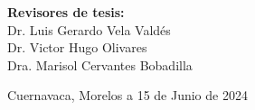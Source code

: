 \begin{titlepage}
\begin{minipage}{0.52\textwidth}
\begin{flushright}
\begin{center}
            \textbf{Revisores de tesis:}\\
    
            Dr. Luis Gerardo Vela Valdés\\
            Dr. Victor Hugo Olivares\\
            Dra. Marisol Cervantes Bobadilla\\
    
            
    \end{center}
    \end{flushright}
    \end{minipage}	
    \vspace*{3cm}
    
    \begin{flushright}
    {\large Cuernavaca, Morelos a 15 de Junio de 2024}
    \end{flushright}
    
    \end{titlepage}